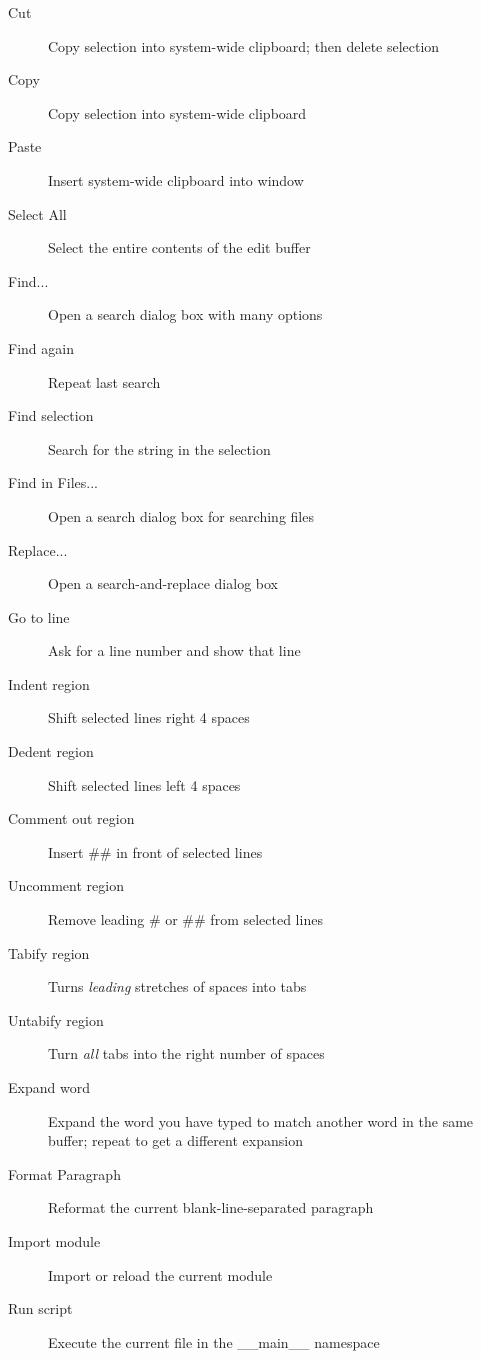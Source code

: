 \begin{description}
\item[Cut]    Copy selection into system-wide clipboard; then delete selection
\item[Copy]   Copy selection into system-wide clipboard
\item[Paste]  Insert system-wide clipboard into window
\item[Select All]     Select the entire contents of the edit buffer
\end{description}

\begin{description}
\item[Find...]        Open a search dialog box with many options
\item[Find again]     Repeat last search
\item[Find selection] Search for the string in the selection
\item[Find in Files...]       Open a search dialog box for searching files
\item[Replace...]     Open a search-and-replace dialog box
\item[Go to line]     Ask for a line number and show that line
\end{description}

\begin{description}
\item[Indent region]  Shift selected lines right 4 spaces
\item[Dedent region]  Shift selected lines left 4 spaces
\item[Comment out region]     Insert \#\# in front of selected lines
\item[Uncomment region]       Remove leading \# or \#\# from selected lines
\item[Tabify region]  Turns \emph{leading} stretches of spaces into tabs
\item[Untabify region]        Turn \emph{all} tabs into the right number of spaces
\item[Expand word]    Expand the word you have typed to match another
                word in the same buffer; repeat to get a different expansion
\item[Format Paragraph]       Reformat the current blank-line-separated paragraph
\end{description}

\begin{description}
\item[Import module]  Import or reload the current module
\item[Run script]     Execute the current file in the __main__ namespace
\end{description}

